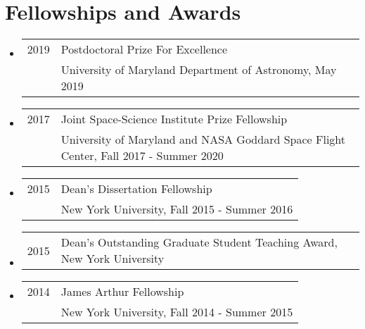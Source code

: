 


\section*{Fellowships and Awards}
\begin{itemize}

\item \begin{tabular}{ll}
2019 & Postdoctoral Prize For Excellence \\
& University of Maryland Department of Astronomy, May 2019 \\
\end{tabular}

\item \begin{tabular}{ll}
2017 & Joint Space-Science Institute Prize Fellowship \\
& University of Maryland and NASA Goddard Space Flight Center, Fall 2017 - Summer 2020 \\
\end{tabular}

\item \begin{tabular}{ll}
2015 & Dean's Dissertation Fellowship \\
& New York University, Fall 2015 - Summer 2016 \\
\end{tabular}

\item \begin{tabular}{ll}
2015 & Dean's Outstanding Graduate Student Teaching Award, New York University
\end{tabular}

\item \begin{tabular}{ll}
2014 & James Arthur Fellowship \\
& New York University, Fall 2014 - Summer 2015 \\
\end{tabular}


\end{itemize}
